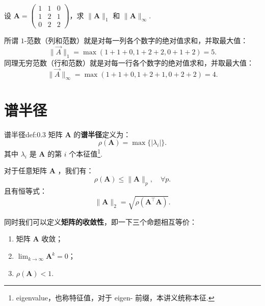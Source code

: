 \begin{problembox}
    \begin{example}
        设 $\mathbf{A} = \begin{pmatrix}
            1 & 1 & 0 \\ 1 & 2 & 1 \\ 0 & 2 & 2
        \end{pmatrix}$，求 $\|\mathbf{A}\|_1$ 和 $\|\mathbf{A}\|_\infty$.
    \end{example}
    \begin{solution}
        所谓 $1$-范数（列和范数）就是对每一列各个数字的绝对值求和，并取最大值：
        \[
            \|\vec{A}\|_1 = \max(1+1+0,1+2+2,0+1+2) = 5.
        \]
        同理无穷范数（行和范数）就是对每一行各个数字的绝对值求和，并取最大值：
        \[
            \|\vec{A}\|_\infty = \max(1+1+0,1+2+1,0+2+2) = 4.
        \]
    \end{solution}
\end{problembox}

\section{谱半径}
\begin{definition}{谱半径}{def:0.3}
    矩阵 $\mathbf{A}$ 的{\bf 谱半径}定义为：
    \[
        \rho(\mathbf{A}) = \max\{|\lambda_i|\}.
    \]
    其中 $\lambda_i$ 是 $\mathbf{A}$ 的第 $i$ 个本征值\footnote{eigenvalue，也称特征值，对于 eigen- 前缀，本讲义统称本征.}.
\end{definition}
对于任意矩阵 $\mathbf{A}$ ，我们有：
\[
    \rho(\mathbf{A}) \leqslant \|\mathbf{A}\|_p,\quad \forall p.
\]
且有恒等式：
\[
    \|  \mathbf{A}\|_2 = \sqrt{\rho(\mathbf{A}^\top\mathbf{A})}.
\]

同时我们可以定义{\bf 矩阵的收敛性}，即一下三个命题相互等价：
\begin{enumerate}
    \item 矩阵 $\mathbf{A}$ 收敛；
    \item $\lim_{k\to \infty} \mathbf{A}^k = 0$；
    \item $\rho(\mathbf{A})<1$.
\end{enumerate}
